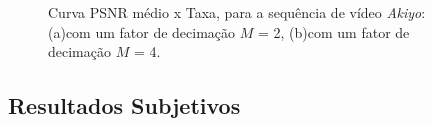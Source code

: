 \begin{figure}[H]
	\centering
	\caption{Curva PSNR médio x Taxa, para a sequência de vídeo \textit{Akiyo}: (a)com um fator de decimação $M$ = 2, (b)com um fator de decimação $M$ = 4.}
	\label{fig:akiyoh264}
\end{figure}
\clearpage
\subsection{Resultados Subjetivos}

